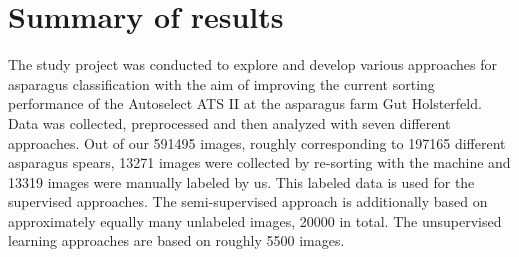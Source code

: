 
\section{Summary of results}
\label{ch:Summary}

The study project was conducted to explore and develop various approaches for asparagus classification with the aim of improving the current sorting performance of the Autoselect ATS II at the asparagus farm Gut Holsterfeld. Data was collected, preprocessed and then analyzed with seven different approaches. Out of our 591495 images, roughly corresponding to 197165 different asparagus spears, 13271 images were collected by re-sorting with the machine and 13319 images were manually labeled by us. This labeled data is used for the supervised approaches. The semi-supervised approach is additionally based on approximately equally many unlabeled images, 20000 in total. The unsupervised learning approaches are based on roughly 5500 images.

